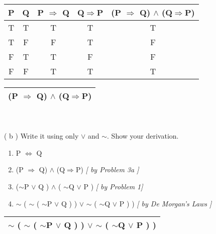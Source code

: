 \documentclass[11pt]{article}
\begin{document}
	\begin{minipage}{0.5\textwidth}
		\begin{tabular}{||c c c c c||} 
 		\hline
 		P & Q & P $\Rightarrow$ Q & Q$\Rightarrow$P & (P $\Rightarrow$ Q) $\wedge$ (Q$\Rightarrow$P)\\ [0.5ex] 
 		\hline\hline
 		T & T & T & T & T\\ 
 		\hline
 		T & F & F & T & F\\
 		\hline
 		F & T & T & F & F\\
 		\hline
 		F & F & T & T & T\\
 		\hline
		\end{tabular}
	\end{minipage}
	\begin{minipage}{0.5\textwidth}
	
		\begin{tabular}{|c|}
		\arrayrulecolor{red}\hline
		(P $\Rightarrow$ Q) $\wedge$ (Q$\Rightarrow$P)\\[0.5ex]
		\hline
		\end{tabular}
	\end{minipage}\\\\

	( b ) Write it using only $\vee$ and $\sim$. Show your derivation.
	
	\begin{enumerate}
		\item P $\Leftrightarrow$ Q
		\item (P $\Rightarrow$ Q) $\wedge$ (Q$\Rightarrow$P) \textit{[ by Problem 3a ]}
		\item ($\sim$P $\vee$ Q ) $\wedge$ ( $\sim$Q $\vee$ P ) \textit{[ by Problem 1]}
		\item $\sim$ ( $\sim$ ( $\sim$P $\vee$ Q ) ) $\vee$ $\sim$ ( $\sim$Q $\vee$ P ) ) \textit{[ by De Morgan's Laws ]}
	\end{enumerate}

	\begin{tabular}{|c|}
		\arrayrulecolor{red}\hline
		$\sim$ ( $\sim$ ( $\sim$P $\vee$ Q ) ) $\vee$ $\sim$ ( $\sim$Q $\vee$ P ) )\\[0.5ex]
		\hline
	\end{tabular}
		




 	
	

	
\end{document}
